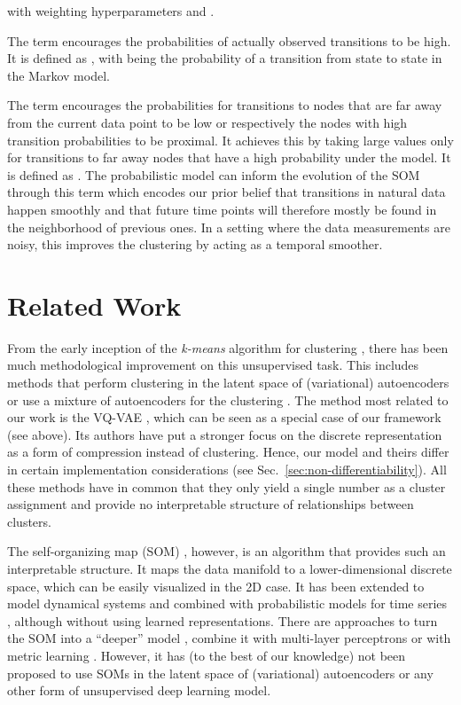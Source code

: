 \documentclass{article}
\begin{document}
with weighting hyperparameters  and .

The term  encourages the probabilities of actually observed transitions to be high.
It is defined as , with  being the probability of a transition from state  to state  in the Markov model.

The term  encourages the probabilities for transitions to nodes that are far away from the current data point to be low or respectively the nodes with high transition probabilities to be proximal.
It achieves this by taking large values only for transitions to far away nodes that have a high probability under the model.
It is defined as .
The probabilistic model can inform the evolution of the SOM through this term which encodes our prior belief that transitions in natural data happen smoothly and that future time points will therefore mostly be found in the neighborhood of previous ones.
In a setting where the data measurements are noisy, this improves the clustering by acting as a temporal smoother.

 
\section{Related Work}

From the early inception of the \emph{k-means} algorithm for clustering \citep{Lloyd1982}, there has been much methodological improvement on this unsupervised task.
This includes methods that perform clustering in the latent space of (variational) autoencoders \citep{Aljalbout2018} or use a mixture of autoencoders for the clustering \citep{Zhang2017a, Locatello2018}.
The method most related to our work is the VQ-VAE \citep{Oord2017}, which can be seen as a special case of our framework (see above).
Its authors have put a stronger focus on the discrete representation as a form of compression instead of clustering.
Hence, our model and theirs differ in certain implementation considerations (see Sec.\ \ref{sec:non-differentiability}).
All these methods have in common that they only yield a single number as a cluster assignment and provide no interpretable structure of relationships between clusters.

The self-organizing map (SOM) \citep{Kohonen1998}, however, is an algorithm that provides such an interpretable structure.
It maps the data manifold to a lower-dimensional discrete space, which can be easily visualized in the 2D case.
It has been extended to model dynamical systems \citep{Barreto2004} and combined with probabilistic models for time series \citep{Sang2008}, although without using learned representations.
There are approaches to turn the SOM into a ``deeper'' model \citep{Dittenbach2000}, combine it with multi-layer perceptrons \citep{Furukawa2005} or with metric learning \citep{Ponski2014}.
However, it has (to the best of our knowledge) not been proposed to use SOMs in the latent space of (variational) autoencoders or any other form of unsupervised deep learning model.
\end{document}
